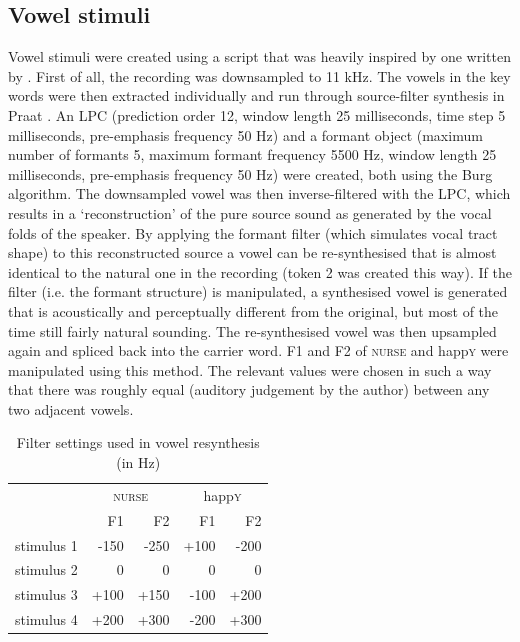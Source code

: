 \subsection{Vowel stimuli}\label{sec.perc_method.vow}

Vowel stimuli were created using a script that was heavily inspired by one written by \textcite{styler2008}.
First of all, the recording was downsampled to 11 kHz.
The vowels in the key words were then extracted individually and run through source-filter synthesis in Praat \parencite{praat}.
An LPC (prediction order 12, window length 25 milliseconds, time step 5 milliseconds, pre-emphasis frequency 50 Hz) and a formant object (maximum number of formants 5, maximum formant frequency 5500 Hz, window length 25 milliseconds, pre-emphasis frequency 50 Hz) were created, both using the Burg algorithm.
The downsampled vowel was then inverse-filtered with the LPC, which results in a `reconstruction' of the pure source sound as generated by the vocal folds of the speaker.
By applying the formant filter (which simulates vocal tract shape) to this reconstructed source a vowel can be re-synthesised that is almost identical to the natural one in the recording (token 2 was created this way).
If the filter (i.e. the formant structure) is manipulated, a synthesised vowel is generated that is acoustically and perceptually different from the original, but most of the time still fairly natural sounding.
The re-synthesised vowel was then upsampled again and spliced back into the carrier word.
F1 and F2 of \textsc{nurse} and happ\textsc{y} were manipulated using this method.
The relevant values were chosen in such a way that there was roughly equal  (auditory judgement by the author) between any two adjacent vowels.

\begin{table}
	\caption{Filter settings used in vowel resynthesis (in Hz)}
	\label{tab.vowel.stimuli}
	
	\begin{tabular}{lrrrr}
		\toprule
		& \multicolumn{2}{c}{\textsc{nurse}} & \multicolumn{2}{c}{happ\textsc{y}}\\
		& F1 & F2 & F1 & F2\\
		\midrule
		stimulus 1 & -150 & -250 & +100 & -200\\
		stimulus 2 & 0 & 0 & 0 & 0\\
		stimulus 3 & +100 & +150 & -100 & +200\\
		stimulus 4 & +200 & +300 & -200 & +300\\
		\bottomrule
	\end{tabular}
\end{table}

